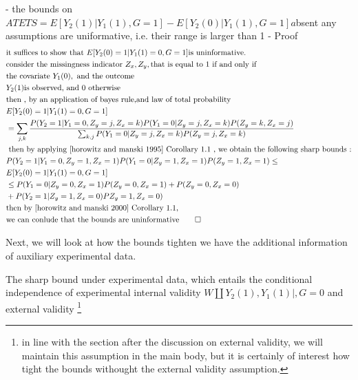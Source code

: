 \documentclass{article}
\begin{document}
\begin{theorem}
- the bounds on $ATETS = E[ Y_2(1) | Y_1(1) , G =1 ] - E[ Y_2(0) | Y_1(1), G =1] a$bsent any assumptions are uniformative, i.e. their range is larger than 1
- Proof \\
\begin{align}
&\text{it suffices to show that } E[ Y_2(0) =1| Y_1(1)=0, G=1] \text{is uninformative.}\\ 
&\text{consider the missingness indicator } Z_x, Z_y, \text{that is equal to 1 if and only if } \\
&\text{the covariate }Y_1(0),\text{ and the outcome} \\
&Y_2(1) \text{is observed, and 0 otherwise} \\
&\text{then , by an application of bayes rule,and law of total probability}\\
&E[ Y_2(0)=1 | Y_1(1)=0, G=1] \\
&= \sum_{j,k} \frac{ P (Y_2 =1 | Y_1 = 0 , Z_y = j, Z_ x = k ) P ( Y_1 = 0 | Z_y =j,Z_ x =k ) P( Z_y = k, Z_x = j) }{ \sum_{ k, j} P( Y_1 = 0 | Z_y = j, Z_x = k ) P (Z_y = j, Z_x = k) }\\
&\text{ then by applying \cite{horowitz and manski 1995} Corollary 1.1 , we obtain the following sharp bounds :} \\
& P(Y_2 =1 | Y_1 =0, Z_y =1, Z_ x =1 ) P( Y_1 = 0 | Z_y =1, Z_x = 1 )P( Z_y = 1, Z_x =1) \leq \\
& E[ Y_2(0)=1 | Y_1(1)=0, G=1] \\
&\leq P( Y_1 = 0 | Z_y = 0 ,Z_x = 1) P( Z_y = 0 , Z_x =1 ) + P( Z_y = 0, Z _ x = 0) \\
&+ P( Y_2 =1 | Z_y = 1, Z_ x =0) P  Z_ y =1, Z_x = 0)  \\
&\text{then by \cite{horowitz and manski 2000} Corollary 1.1,}\\
&\text{we can conlude that the bounds are uninformative} \qed 
\end{align} 
\end{theorem}






Next, we will look at how the bounds tighten we have the additional information of auxiliary experimental data. 

The sharp bound under experimental data, which entails the conditional independence of experimental internal validity $ W \amalg Y_2(1), Y_1(1) | ,G=0$ and external validity \footnote{in line with the section after the discussion on external validity, we will maintain this assumption in the main body, but it is certainly of interest how tight the bounds withought the external validity assumption.
}
\end{document}
